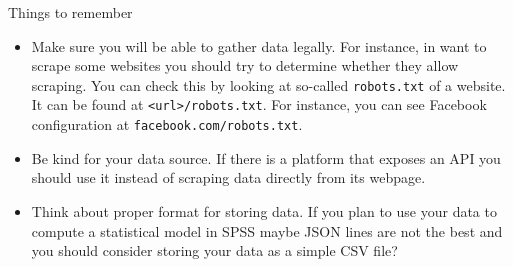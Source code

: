 \begin{frame}{Things to remember}
\begin{itemize}
    \item Make sure you will be able to gather data legally.
    For instance, in want to scrape some websites you should try
    to determine whether they allow scraping. You can check this by
    looking at so-called \texttt{robots.txt} of a website.
    It can be found at \texttt{<url>/robots.txt}. For instance,
    you can see Facebook configuration at \texttt{facebook.com/robots.txt}.
    \item Be kind for your data source. If there is a platform that exposes
    an API you should use it instead of scraping data directly from its
    webpage.
    \item Think about proper format for storing data. If you plan to use
    your data to compute a statistical model in SPSS maybe JSON lines are not
    the best and you should consider storing your data as a simple CSV file?
\end{itemize}
\end{frame}



